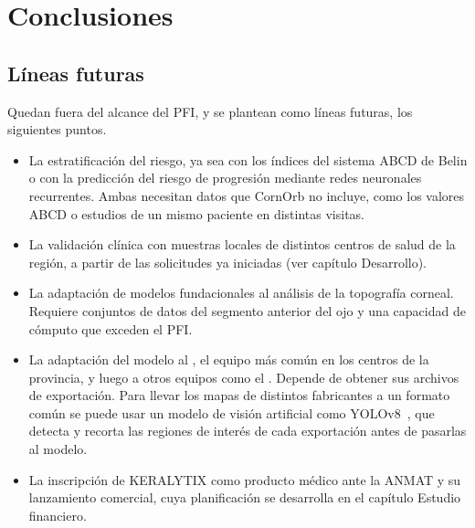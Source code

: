 \chapter{Conclusiones}


\section{Líneas futuras}
\label{sec:lineas_futuras}

    Quedan fuera del alcance del PFI, y se plantean como líneas futuras, los siguientes puntos.

    \begin{itemize}
        \item La estratificación del riesgo, ya sea con los índices del sistema ABCD de Belin o con la predicción del riesgo de progresión mediante redes neuronales recurrentes. Ambas necesitan datos que CornOrb no incluye, como los valores ABCD o estudios de un mismo paciente en distintas visitas.

        \item La validación clínica con muestras locales de distintos centros de salud de la región, a partir de las solicitudes ya iniciadas (ver capítulo Desarrollo).

        \item La adaptación de modelos fundacionales al análisis de la topografía corneal. Requiere conjuntos de datos del segmento anterior del ojo y una capacidad de cómputo que exceden el PFI.

        \item La adaptación del modelo al \Pentacam{}, el equipo más común en los centros de la provincia, y luego a otros equipos como el \Sirius{}. Depende de obtener sus archivos de exportación. Para llevar los mapas de distintos fabricantes a un formato común se puede usar un modelo de visión artificial como YOLOv8~\cite{yolov8}, que detecta y recorta las regiones de interés de cada exportación antes de pasarlas al modelo.

        \item La inscripción de KERALYTIX como producto médico ante la ANMAT y su lanzamiento comercial, cuya planificación se desarrolla en el capítulo Estudio financiero.
    \end{itemize}
